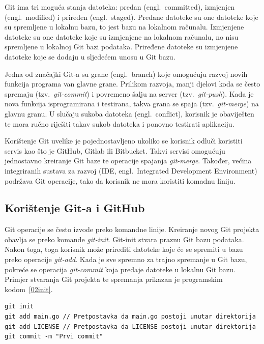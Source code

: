Git ima tri moguća stanja datoteka: predan (engl.~committed), izmjenjen (engl.~modified) i priređen
(engl.~staged). Predane datoteke su one datoteke koje su spremljene u lokalnu bazu, to jest bazu na
lokalnom računalu. Izmjenjene datoteke su one datoteke koje su izmjenjene na lokalnom računalu, no
nisu spremljene u lokalnoj Git bazi podataka. Priređene datoteke su izmjenjene datoteke koje se
dodaju u sljedećem unosu u Git bazu.

Jedna od značajki Git-a su grane (engl.~branch) koje omogućuju razvoj novih funkcija programa van
glavne grane. Prilikom razvoja, manji djelovi koda se često spremaju (tzv.~\textit{git-commit}) i
povremeno šalju na server (tzv.~\textit{git-push}). Kada je nova funkcija isprogramirana i
testirana, takva grana se spaja (tzv.~\textit{git-merge}) na glavnu granu. U slučaju sukoba datoteka
(engl.~conflict), korisnik je obaviješten te mora ručno riješiti takav sukob datoteka i ponovno
testirati aplikaciju.

Korištenje Git uvelike je pojednostavljeno ukoliko se korisnik odluči koristiti servis kao što je
GitHub, Gitlab ili Bitbucket. Takvi servisi omogućuju jednostavno kreiranje Git baze te operacije
spajanja \textit{git-merge}. Također, većina integriranih sustava za razvoj (IDE, engl.~Integrated
Development Environment) podržava Git operacije, tako da korisnik ne mora koristiti komadnu liniju.

\subsection{Korištenje Git-a i GitHub}
Git operacije se često izvode preko komandne linije. Kreiranje novog Git projekta obavlja se preko
komande \textit{git-init}. Git-init stvara praznu Git bazu podataka. Nakon toga, toga korisnik može
prirediti datoteke koje će se spremiti u bazu preko operacije \textit{git-add}. Kada je sve spremno
za trajno spremanje u Git bazu, pokreće se operacija \textit{git-commit} koja predaje datoteke u
lokalnu Git bazu. Primjer stvaranja Git projekta te spremanja prikazan je programskim
kodom~\ref{02init}.

\begin{lstlisting}
git init
git add main.go // Pretpostavka da main.go postoji unutar direktorija
git add LICENSE // Pretpostavka da LICENSE postoji unutar direktorija
git commit -m "Prvi commit"
\end{lstlisting}

